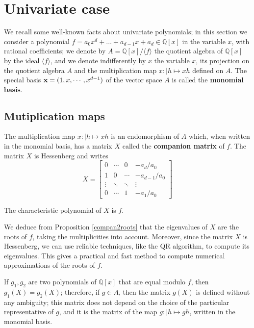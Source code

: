 \documentclass{standalone}
\begin{document}
\section{Univariate case}
\label{univariate}
We recall some well-known facts about univariate polynomials;
in this section we consider a polynomial $f = a_0x^d + \dots + a_{d-1}x + a_d \in \mathbb{Q}[x]$ in the variable $x$, with rational coefficients; we denote by $A = \mathbb{Q}[x]/\langle f \rangle$ the quotient algebra of $\mathbb{Q}[x]$ by the ideal $\langle f \rangle$, and we denote indifferently by $x$ the variable $x$, its projection on the quotient algebra $A$ and the multiplication map $x : \left\vert h \mapsto xh \right.$ defined on $A$. 
The special basis $\bold{x} = (1, x,\cdots, x^{d-1})$ of the vector space $A$ is called the {\bf monomial basis}.

\subsection{Mutiplication maps}
The multiplication map $x : \left\vert h \mapsto xh \right.$ is an endomorphism of $A$ which, when written in the monomial basis, has a matrix $X$ called the {\bf companion matrix} of $f$. 
The matrix $X$ is Hessenberg and writes
\begin{equation}
\label{compan}
X =
\begin{bmatrix}
	0 & \cdots & 0 & -a_d/a_0 \\
	1 & 0 & \cdots & -a_{d-1}/a_0 \\
	\vdots  & \ddots  & \ddots & \vdots  \\
	0 & \cdots & 1 & -a_1/a_0
\end{bmatrix}
\end{equation}
\begin{prop}
\label{compan2roots}
The characteristic polynomial of $X$ is $f$.
\end{prop}

\begin{rem}
We deduce from Proposition \ref{compan2roots} that the eigenvalues of $X$ are the roots of $f$, taking the multiplicities into account. 
Moreover, since the matrix $X$ is Hessenberg, we can use reliable techniques, like the QR algorithm, to compute its eigenvalues. 
This gives a practical and fast method to compute numerical approximations of the roots of $f$. 
\end{rem}

\begin{rem}
\label{g_1=g_2}
If $g_1, g_2$ are two polynomials of $\mathbb{Q}[x]$ that are equal modulo $f$, then $g_1(X) = g_2(X)$;
therefore, if $g \in A$, then the matrix $g(X)$ is defined without any ambiguity;
this matrix does not depend on the choice of the particular representative of $g$, and it is the matrix of the map $g:\left\vert h \mapsto gh \right.$, written in the monomial basis.
\end{rem}
\end{document}
